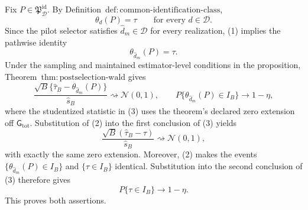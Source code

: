 Fix \(P\in\mathfrak P_{\mathcal D}^{\mathrm{id}}\).  By Definition~\(\mathrm{def{:}common\text{-}identification\text{-}class}\),
\[
 \theta_d(P)=\tau
 \qquad\text{for every }d\in\mathcal D. \tag{1}
\]
Since the pilot selector satisfies \(\widehat d_m\in\mathcal D\) for every realization, (1) implies the pathwise identity
\[
 \theta_{\widehat d_m}(P)=\tau. \tag{2}
\]
Under the sampling and maintained estimator-level conditions in the proposition, Theorem~\(\mathrm{thm{:}postselection\text{-}wald}\) gives
\[
 \frac{\sqrt B\{\widehat\tau_B-\theta_{\widehat d_m}(P)\}}
 {\widehat s_B}
 \rightsquigarrow\mathcal N(0,1),
 \qquad
 P\{\theta_{\widehat d_m}(P)\in I_B\}\longrightarrow1-\eta, \tag{3}
\]
where the studentized statistic in (3) uses the theorem's declared zero extension off \(\mathsf G_{\mathrm{tot}}\).  Substitution of (2) into the first conclusion of (3) yields
\[
 \frac{\sqrt B(\widehat\tau_B-\tau)}{\widehat s_B}
 \rightsquigarrow\mathcal N(0,1),
\]
with exactly the same zero extension.  Moreover, (2) makes the events \(\{\theta_{\widehat d_m}(P)\in I_B\}\) and \(\{\tau\in I_B\}\) identical.  Substitution into the second conclusion of (3) therefore gives
\[
 P\{\tau\in I_B\}\longrightarrow1-\eta.
\]
This proves both assertions.